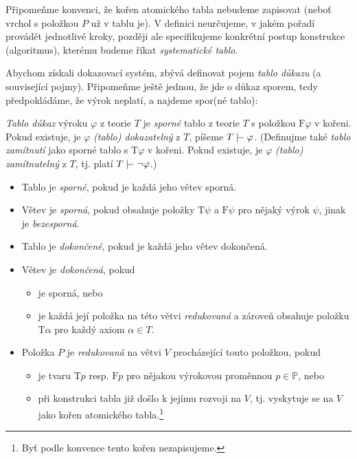 Připomeňme konvenci, že kořen atomického tabla nebudeme zapisovat (neboť vrchol s položkou $P$ už v tablu je). V definici neurčujeme, v jakém pořadí provádět jednotlivé kroky, později ale specifikujeme konkrétní postup konstrukce (algoritmus), kterému budeme říkat \emph{systematické tablo}. 

Abychom získali dokazovací systém, zbývá definovat pojem \emph{tablo důkazu} (a související pojmy). Připomeňme ještě jednou, že jde o důkaz sporem, tedy předpokládáme, že výrok neplatí, a najdeme spor(né tablo):

\begin{definition}
\emph{Tablo důkaz} výroku $\varphi$ z teorie $T$ je \emph{sporné} tablo z teorie $T$ s položkou $\mathrm{F}\varphi$ v kořeni. Pokud existuje, je $\varphi$ \emph{(tablo) dokazatelný} z $T$, píšeme $T\proves\varphi$. (Definujme také \emph{tablo zamítnutí} jako sporné tablo s $\mathrm{T}\varphi$ v kořeni. Pokud existuje, je $\varphi$ \emph{(tablo) zamítnutelný} z $T$, tj. platí $T\proves\neg\varphi$.)  
\begin{itemize}
    \item Tablo je \emph{sporné}, pokud je každá jeho větev sporná.
    \item Větev je \emph{sporná}, pokud obsahuje položky $\mathrm{T}\psi$ a $\mathrm{F}\psi$ pro nějaký výrok $\psi$, jinak je \emph{bezesporná}.
    \item Tablo je \emph{dokončené}, pokud je každá jeho větev dokončená.
    \item Větev je \emph{dokončená}, pokud 
    \begin{itemize}
        \item je sporná, nebo
        \item je každá její položka na této větvi \emph{redukovaná} a zároveň obsahuje položku $\mathrm{T}\alpha$ pro každý axiom $\alpha\in T$.
    \end{itemize}
     
    \item Položka $P$ je \emph{redukovaná} na větvi $V$ procházející touto položkou, pokud 
    \begin{itemize}
        \item je tvaru $\mathrm{T}p$ resp. $\mathrm{F}p$ pro nějakou výrokovou proměnnou $p\in\mathbb P$, nebo
        \item při konstrukci tabla již došlo k jejímu rozvoji na $V$, tj. vyskytuje se na $V$ jako kořen atomického tabla.\footnote{Byť podle konvence tento kořen nezapisujeme.}
    \end{itemize}
\end{itemize}
\end{definition}

